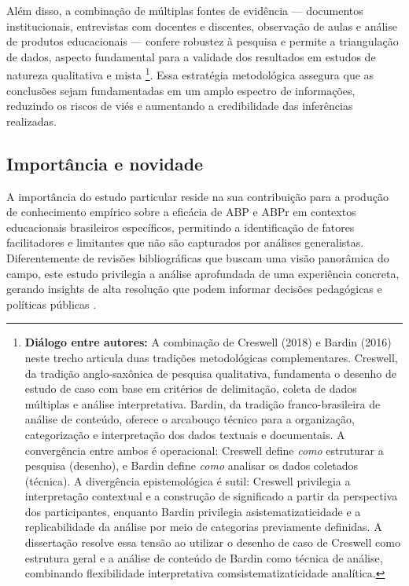 Além disso, a combinação de múltiplas fontes de evidência — documentos institucionais, entrevistas com docentes e discentes, observação de aulas e análise de produtos educacionais — confere robustez à pesquisa e permite a triangulação de dados, aspecto fundamental para a validade dos resultados em estudos de natureza qualitativa e mista \cite{BARDIN2016}\footnote{\textbf{Diálogo entre autores:} A combinação de Creswell (2018) e Bardin (2016) neste trecho articula duas tradições metodológicas complementares. Creswell, da tradição anglo-saxônica de pesquisa qualitativa, fundamenta o desenho de estudo de caso com base em critérios de delimitação, coleta de dados múltiplas e análise interpretativa. Bardin, da tradição franco-brasileira de análise de conteúdo, oferece o arcabouço técnico para a organização, categorização e interpretação dos dados textuais e documentais. A convergência entre ambos é operacional: Creswell define \textit{como} estruturar a pesquisa (desenho), e Bardin define \textit{como} analisar os dados coletados (técnica). A divergência epistemológica é sutil: Creswell privilegia a interpretação contextual e a construção de significado a partir da perspectiva dos participantes, enquanto Bardin privilegia asistematizaticidade e a replicabilidade da análise por meio de categorias previamente definidas. A dissertação resolve essa tensão ao utilizar o desenho de caso de Creswell como estrutura geral e a análise de conteúdo de Bardin como técnica de análise, combinando flexibilidade interpretativa comsistematizaticidade analítica.}. Essa estratégia metodológica assegura que as conclusões sejam fundamentadas em um amplo espectro de informações, reduzindo os riscos de viés e aumentando a credibilidade das inferências realizadas.

\subsection{Importância e novidade}
\label{subsec:jp_importancia}

A importância do estudo particular reside na sua contribuição para a produção de conhecimento empírico sobre a eficácia de ABP e ABPr em contextos educacionais brasileiros específicos, permitindo a identificação de fatores facilitadores e limitantes que não são capturados por análises generalistas. Diferentemente de revisões bibliográficas que buscam uma visão panorâmica do campo, este estudo privilegia a análise aprofundada de uma experiência concreta, gerando insights de alta resolução que podem informar decisões pedagógicas e políticas públicas \cite{CRESWELL2018}.

